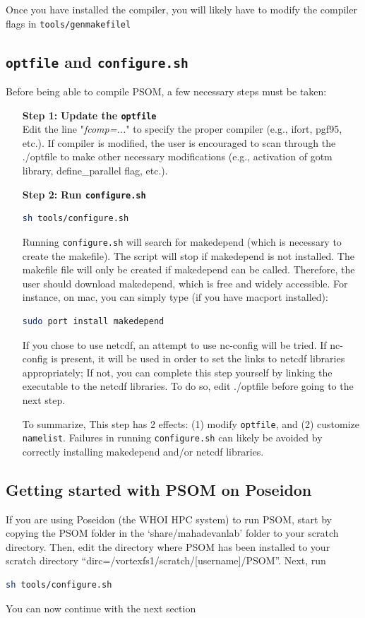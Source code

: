 \documentclass[12pt,letterpaper,titlepage]{article}
\begin{document}
Once you have installed the compiler, you will likely have to modify the compiler flags in \texttt{tools/genmakefilel}

\subsection{\texttt{optfile} and \texttt{configure.sh}}

Before being able to compile PSOM, a few necessary steps must be taken:

\begin{itemize}
	\item[\textbf{Step 1:}] \textbf{Update the \texttt{optfile}}\\
	Edit the line "\textit{fcomp=...}" to specify the proper compiler (e.g., ifort, pgf95, etc.). If compiler is modified, the user is encouraged to scan through the ./optfile to make other necessary modifications (e.g., activation of gotm library, define\_parallel flag, etc.).
	
	\item[\textbf{Step 2:}] \textbf{Run \texttt{configure.sh}}
\begin{lstlisting}[language=sh, breaklines]
		sh tools/configure.sh
\end{lstlisting}
Running \texttt{configure.sh} will search for makedepend (which is necessary to create the makefile). The script will stop if makedepend is not installed. The makefile file will only be created if makedepend can be called. Therefore, the user should download makedepend, which is free and widely accessible. For instance, on mac, you can simply type (if you have macport installed):
\begin{lstlisting}[language=sh, breaklines]
 sudo port install makedepend
\end{lstlisting}
If you chose to use netcdf, an attempt to use nc-config will be tried. If nc-config is present, it will be used in order to set the links to netcdf libraries appropriately; If not, you can complete this step yourself by linking the executable to the netcdf libraries. To do so, edit ./optfile before going to the next step.

To summarize, This step has 2 effects: (1) modify \texttt{optfile}, and (2) customize \texttt{namelist}. Failures in running \texttt{configure.sh} can likely be avoided by correctly installing makedepend and/or netcdf libraries.

\end{itemize}

\subsection{Getting started with PSOM on Poseidon}
If you are using Poseidon (the WHOI HPC system) to run PSOM, start by copying the PSOM folder in the `share/mahadevanlab' folder to your scratch directory. Then, edit the directory where PSOM has been installed to your scratch directory ``dirc=/vortexfs1/scratch/[username]/PSOM''. Next, run
\begin{lstlisting}[language=sh, breaklines]
		sh tools/configure.sh
\end{lstlisting}
You can now continue with the next section
\end{document}
